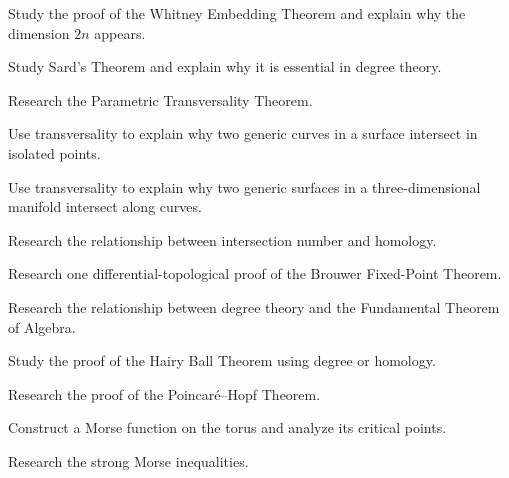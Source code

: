 \begin{exercise}[4]
Study the proof of the Whitney Embedding Theorem and explain why the
dimension \(2n\) appears.
\end{exercise}

\begin{exercise}[4]
Study Sard's Theorem and explain why it is essential in degree theory.
\end{exercise}

\begin{exercise}[4]
Research the Parametric Transversality Theorem.
\end{exercise}

\begin{exercise}[4]
Use transversality to explain why two generic curves in a surface intersect
in isolated points.
\end{exercise}

\begin{exercise}[4]
Use transversality to explain why two generic surfaces in a
three-dimensional manifold intersect along curves.
\end{exercise}

\begin{exercise}[4]
Research the relationship between intersection number and homology.
\end{exercise}

\begin{exercise}[4]
Research one differential-topological proof of the Brouwer Fixed-Point
Theorem.
\end{exercise}

\begin{exercise}[4]
Research the relationship between degree theory and the Fundamental Theorem
of Algebra.
\end{exercise}

\begin{exercise}[4]
Study the proof of the Hairy Ball Theorem using degree or homology.
\end{exercise}

\begin{exercise}[4]
Research the proof of the Poincar\'e--Hopf Theorem.
\end{exercise}

\begin{exercise}[4]
Construct a Morse function on the torus and analyze its critical points.
\end{exercise}

\begin{exercise}[4]
Research the strong Morse inequalities.
\end{exercise}


